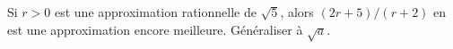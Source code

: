 Si $r > 0$ est une approximation rationnelle de $\sqrt{5}$, alors $(2r + 5)/(r + 2)$ en est une approximation encore meilleure. Généraliser à $\sqrt{a}$.
